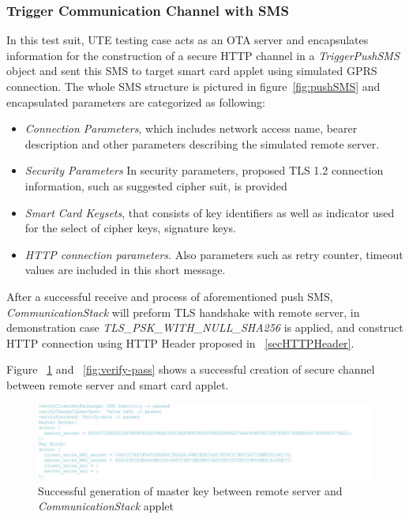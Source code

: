 \subsubsection{Trigger Communication Channel with SMS} \label{secAppletTest1}
In this test suit, UTE testing case acts as an OTA server and encapsulates information for the construction of a secure HTTP channel in a \emph{TriggerPushSMS} object and sent this SMS to target smart card applet using simulated GPRS connection.  The whole SMS structure is pictured in figure~\ref{fig:pushSMS} and encapsulated parameters are categorized as following:
\begin{itemize}
\item \emph{Connection Parameters}, which includes network access name, bearer description and other parameters describing the simulated remote server.
\item \emph{Security Parameters} In security parameters, proposed TLS 1.2 connection information, such as suggested cipher suit, is provided
\item \emph{Smart Card Keysets}, that consists of key identifiers as well as indicator used for the select of cipher keys, signature keys.
\item \emph{HTTP connection parameters}. Also parameters such as retry counter, timeout values are included in this short message.
\end{itemize}
After a successful receive and process of aforementioned push SMS, \emph{CommunicationStack} will preform TLS handshake with remote server, in demonstration case \emph{TLS\_PSK\_WITH\_NULL\_SHA256} is applied, and construct HTTP connection using HTTP Header proposed in ~\ref{secHTTPHeader}.

Figure ~\ref{fig:mk} and ~\ref{fig:verify-pass} shows a successful creation of secure channel between remote server and smart card applet.

\begin{figure}[!htp]
	\centering
	\includegraphics[width=1.1\textwidth]{Images/impl/mk.jpg}
		\caption{Successful generation of master key between remote server and \emph{CommunicationStack} applet}
	\label{fig:mk}
\end{figure}

